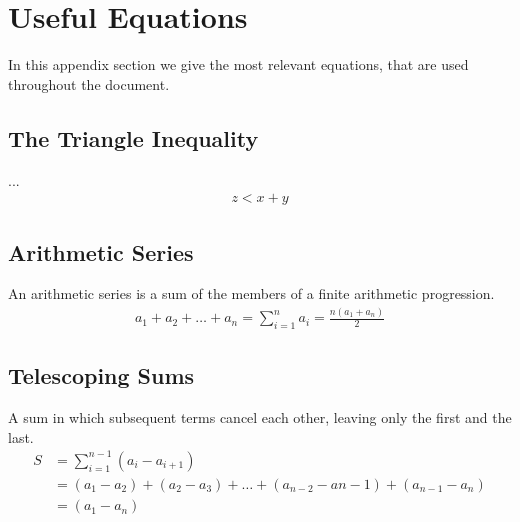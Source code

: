 
\thispagestyle{fancyplain}

\chapter{Useful Equations}
In this appendix section we give the most relevant equations, that are used
throughout the document.

\section{The Triangle Inequality}
\label{appendix:equations|eqn:triangle-inequality}
...
\begin{align}
	z < x + y
\end{align}

\section{Arithmetic Series}
\label{appendix:equations|eqn:arithmetic-series}
An arithmetic series is a sum of the members of a finite arithmetic
progression.
\begin{align}
	a_1 + a_2 + \dots + a_n = \sum_{i=1}^{n}a_i = \frac{n(a_1 + a_n)}{2}
\end{align}

\section{Telescoping Sums}
\label{appendix:equations|eqn:telescoping}
A sum in which subsequent terms cancel each other, leaving only the first and
the last.
\begin{align}
	S &= \sum_{i=1}^{n-1}(a_{i} - a_{i+1}) \\
	&= (a_1-a_2)+(a_2-a_3) + \dots + (a_{n-2}-a{n-1}) + (a_{n-1}-a_n)
	\nonumber \\
	&= (a_1 - a_n) \nonumber
\end{align}

